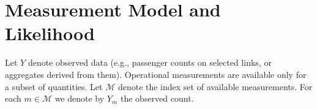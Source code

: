 \section{Measurement Model and Likelihood}

Let $Y$ denote observed data (e.g., passenger counts on selected links, or aggregates derived from them).
Operational measurements are available only for a subset of quantities. Let $\mathcal{M}$ denote the index set of available measurements.
For each $m\in\mathcal{M}$ we denote by $Y_m$ the observed count.

